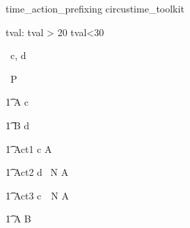 \begin{zsection}
   \SECTION time\_action\_prefixing \parents circustime\_toolkit
\end{zsection}


\begin{axdef}
   tval: \nat
\where
   tval > 20 \land tval<30
\end{axdef}


\begin{circus}
   \circchannel\ c, d \\
\end{circus}

\begin{circus}
    \circprocess\ P \circdef \circbegin \\
\end{circus}

\begin{circusaction}
    	\t1 A \circdef c \then \Skip \\
\end{circusaction}

\begin{circusaction}
        \t1 B \circdef d \then \Skip \\
\end{circusaction}

\begin{circusaction}
        \t1 Act1 \circdef  c \then {} \rcirctime A  \\
\end{circusaction}


\begin{circusaction}
        \t1 Act2 \circdef d \circat~N  \then A \\
\end{circusaction}

\begin{circusaction}
        \t1 Act3 \circdef  c~\circat~N \then {} \rcirctime A  \\
\end{circusaction}




\begin{circusaction}        
        \t1 \circspot A \circseq B\\
\end{circusaction}

\begin{circus}    
\circend
\end{circus}


